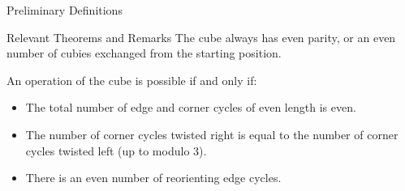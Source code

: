 \documentclass[final]{beamer}
\newlength{\colwidth}
\begin{document}
\begin{frame}[t]
\begin{columns}[t]
\begin{column}{\colwidth}
\begin{alertblock}{Preliminary Definitions}

  \end{alertblock}

  \begin{block}{Relevant Theorems and Remarks}
The cube always has even parity, or an even number of cubies
exchanged from the starting position.

      An operation of the cube is possible if and only if:
            \begin{itemize}
              \item The total number of edge and corner cycles of even length is even.
              \item The number of corner cycles twisted right is equal to the number of corner cycles twisted left (up to modulo $3$).
              \item There is an even number of reorienting edge cycles.
            \end{itemize}







  \end{block}



\end{column}


\end{columns}
\end{frame}
\end{document}
